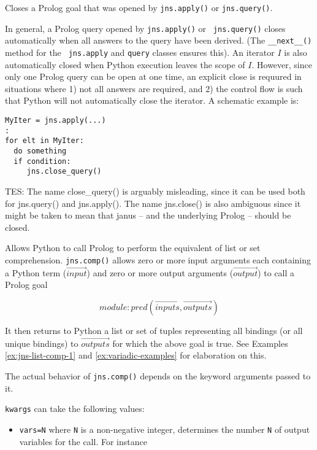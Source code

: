 \begin{description}
 Closes a
Prolog goal that was opened by {\tt jns.apply()} or {\tt jns.query()}.

In general, a Prolog query opened by {\tt jns.apply()} or {\tt
  jns.query()} closes automatically when all answers to the query have
been derived.  (The {\tt \_\_next\_\_()} method for the {\tt
  jns.apply} and {\tt query} classes ensures this).  An iterator $I$
is also automatically closed when Python execution leaves the scope of
$I$.  However, since only one Prolog query can be open at one time, an
explicit close is requured in situations where 1) not all answers are
required, and 2) the control flow is such that Python will not
automatically close the iterator.  A schematic example is:
\begin{verbatim}
MyIter = jns.apply(...)
:
for elt in MyIter:
  do something
  if condition:
     jns.close_query()    
\end{verbatim}


{\sc TES: The name close\_query() is arguably misleading, since it can
  be used both for jns.query() and jns.apply().  The name jns.close()
  is also ambiguous since it might be taken to mean that janus -- and
  the underlying Prolog -- should be closed.}

  Allows Python to call Prolog to perform the equivalent of list or set
  comprehension.  {\tt jns.comp()} allows zero or more input arguments
  each containing a Python term ($\overrightarrow{input}$) and zero or
  more output arguments ($\overrightarrow{output}$) to call a Prolog goal

\[module:pred(\overrightarrow{inputs},\overrightarrow{outputs}) \]

It then returns to Python a list or set of tuples representing all
bindings (or all unique bindings) to $\overrightarrow{outputs}$ for
which the above goal is true.  See Examples \ref{ex:jns-list-comp-1}
and \ref{ex:variadic-examples} for elaboration on this.

The actual behavior of {\tt jns.comp()} depends on the keyword
arguments passed to it.

{\tt kwargs} can take the following values:
\begin{itemize}
  \item {\tt vars=N} where {\tt N} is a non-negative integer,
    determines the number {\tt N} of output variables for the call.
    For instance
    

\end{itemize}
\end{description}
